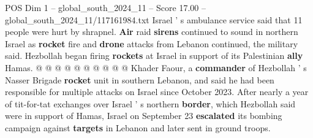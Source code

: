 \begin{textsample}{POS Dim 1 – global\_south\_2024\_11 – Score 17.00 – global\_south\_2024\_11/117161984.txt}
Israel ' s ambulance service said that 11 people were hurt by shrapnel. \textbf{Air} raid \textbf{sirens} continued to sound in northern Israel as \textbf{rocket} fire and \textbf{drone} attacks from Lebanon continued, the military said.
Hezbollah began firing \textbf{rockets} at Israel in support of its Palestinian \textbf{ally} Hamas. @ @ @ @ @ @ @ @ @ @ Khader Faour, a \textbf{commander} of Hezbollah ' s Nasser Brigade \textbf{rocket} unit in southern Lebanon, and said he had been responsible for multiple attacks on Israel since October 2023.
After nearly a year of tit-for-tat exchanges over Israel ' s northern \textbf{border}, which Hezbollah said were in support of Hamas, Israel on September 23 \textbf{escalated} its bombing campaign against \textbf{targets} in Lebanon and later sent in ground troops.

\end{textsample}
